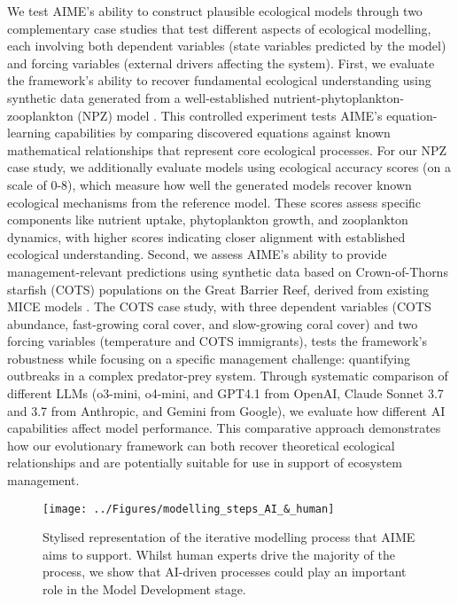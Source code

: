 We test AIME's ability to construct plausible ecological models through two complementary case studies that test different aspects of ecological modelling, each involving both dependent variables (state variables predicted by the model) and forcing variables (external drivers affecting the system). First, we evaluate the framework's ability to recover fundamental ecological understanding using synthetic data generated from a well-established nutrient-phytoplankton-zooplankton (NPZ) model \citep{edwards1999zooplankton}.  This controlled experiment tests AIME's equation-learning capabilities by comparing discovered equations against known mathematical relationships that represent core ecological processes. For our NPZ case study, we additionally evaluate models using ecological accuracy scores (on a scale of 0-8), which measure how well the generated models recover known ecological mechanisms from the reference model. These scores assess specific components like nutrient uptake, phytoplankton growth, and zooplankton dynamics, with higher scores indicating closer alignment with established ecological understanding. Second, we assess AIME's ability to provide management-relevant predictions using synthetic data based on Crown-of-Thorns starfish (COTS) populations on the Great Barrier Reef, derived from existing MICE models \citep{Morello_Plaganyi_Babcock_Sweatman_Hillary_Punt_2014, Rogers_Plaganyi_2022,Plaganyi_Punt_Hillary_Morello_Thebaud_Hutton_Pillans_Thorson_Fulton_Smith_et_al_2014, Condie_Anthony_Babcock_Baird_Beeden_Fletcher_Gorton_Harrison_Hobday_Plaganyi_et_al_2021}. The COTS case study, with three dependent variables (COTS abundance, fast-growing coral cover, and slow-growing coral cover) and two forcing variables (temperature and COTS immigrants), tests the framework's robustness while focusing on a specific management challenge: quantifying outbreaks in a complex predator-prey system. Through systematic comparison of different LLMs (o3-mini, o4-mini, and GPT4.1 from OpenAI, Claude Sonnet 3.7 and 3.7 from Anthropic, and Gemini from Google), we evaluate how different AI capabilities affect model performance. This comparative approach demonstrates how our evolutionary framework can both recover theoretical ecological relationships and are potentially suitable for use in support of ecosystem management.

\begin{figure}[H]
    \centering
    \texttt{[image: ../Figures/modelling\_steps\_AI\_\&\_human]}
    \caption{Stylised representation of the iterative modelling process that AIME aims to support. Whilst human experts drive the majority of the process, we show that AI-driven processes could play an important role in the Model Development stage.}
    \label{fig:modelling_intro}
    \end{figure}